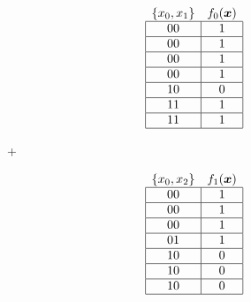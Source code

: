 \begin{figure}[!htb]
\small
\begin{minipage}{.95\linewidth}\centering
  \begin{minipage}[b]{.21\linewidth}\centering
    \begin{align*}
      \begin{array}{cc}
        \{x_0,x_1\}                    & f_0(\bm{x})              \\ \hline
        \multicolumn{1}{|c|}{00} & \multicolumn{1}{c|}{1} \\ \hline
        \multicolumn{1}{|c|}{00} & \multicolumn{1}{c|}{1} \\ \hline
        \multicolumn{1}{|c|}{00} & \multicolumn{1}{c|}{1} \\ \hline
        \multicolumn{1}{|c|}{00} & \multicolumn{1}{c|}{1} \\ \hline
        \multicolumn{1}{|c|}{10} & \multicolumn{1}{c|}{0} \\ \hline
        \multicolumn{1}{|c|}{11} & \multicolumn{1}{c|}{1} \\ \hline
        \multicolumn{1}{|c|}{11} & \multicolumn{1}{c|}{1} \\ \hline
      \end{array}
    \end{align*}
  \end{minipage}
  \begin{minipage}[b]{.1\linewidth}\centering
      +
      \vspace{4em}
  \end{minipage}
  \begin{minipage}[b]{.21\linewidth}\centering
    \begin{align*}
      \begin{array}{cc}
        \{x_0,x_2\}                    & f_1(\bm{x})      \\ \hline
        \multicolumn{1}{|c|}{00} & \multicolumn{1}{c|}{1} \\ \hline
        \multicolumn{1}{|c|}{00} & \multicolumn{1}{c|}{1} \\ \hline
        \multicolumn{1}{|c|}{00} & \multicolumn{1}{c|}{1} \\ \hline
        \multicolumn{1}{|c|}{01} & \multicolumn{1}{c|}{1} \\ \hline
        \multicolumn{1}{|c|}{10} & \multicolumn{1}{c|}{0} \\ \hline
        \multicolumn{1}{|c|}{10} & \multicolumn{1}{c|}{0} \\ \hline
        \multicolumn{1}{|c|}{10} & \multicolumn{1}{c|}{0} \\ \hline

\end{array}
\end{align*}
\end{minipage}
\end{minipage}
\end{figure}
